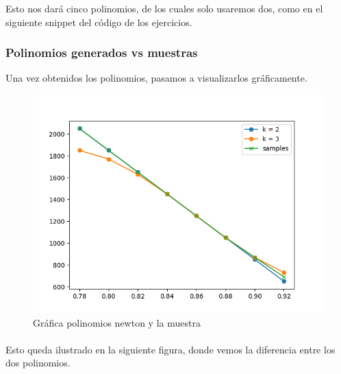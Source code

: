 

Esto nos dará cinco polinomios, de los cuales solo usaremos dos, como en el siguiente snippet del código de los ejercicios.




\newpage 

\subsubsection{Polinomios generados vs muestras}

Una vez obtenidos los polinomios, pasamos a visualizarlos gráficamente.

\begin{figure}[H]
	\includegraphics[width=\linewidth]{figures/figure4.png}
	\caption{Gráfica polinomios newton y la muestra}
	\label{fig:interp_newt}
\end{figure}



\newpage 
\paragraph{} 
Esto queda ilustrado en la siguiente figura, donde vemos la diferencia entre los dos polinomios. 

